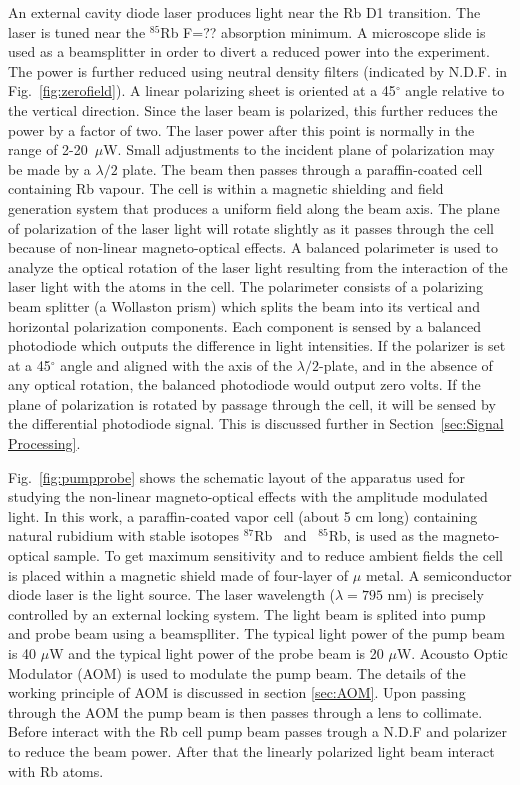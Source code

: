   An external cavity diode laser produces light near the Rb D1 transition.  The laser is tuned near the $^{85}$Rb F=?? absorption minimum.  A microscope slide is used as a beamsplitter in order to divert a reduced power into the experiment.  The power is further reduced using neutral density filters (indicated by N.D.F. in Fig.~\ref{fig:zerofield}).  A linear polarizing sheet is oriented at a 45$^\circ$ angle relative to the vertical direction.  Since the laser
beam is polarized, this further reduces the power by a factor of two. The laser power after this point is normally in the range of 2-20~$\mu$W.  Small adjustments to the incident plane of polarization may be made by a $\lambda/2$ plate.  The beam then passes through a paraffin-coated cell containing Rb vapour.  The cell is within a
magnetic shielding and field generation system that produces a uniform field along the beam axis.  The plane of polarization of the laser
light will rotate slightly as it passes through the cell because of
non-linear magneto-optical effects.  A balanced polarimeter is used to
analyze the optical rotation of the laser light resulting from the
interaction of the laser light with the atoms in the cell.  The
polarimeter consists of a polarizing beam splitter (a Wollaston prism)
which splits the beam into its vertical and horizontal polarization
components.  Each component is sensed by a balanced photodiode which
outputs the difference in light intensities.  If the polarizer is set
at a 45$^\circ$ angle and aligned with the axis of the
$\lambda/2$-plate, and in the absence of any optical rotation, the
balanced photodiode would output zero volts.  If the plane of
polarization is rotated by passage through the cell, it will be sensed
 by the differential photodiode signal.  This is discussed further in Section~\ref{sec:Signal Processing}.
 
 Fig.~\ref{fig:pumpprobe}  shows the schematic layout of the apparatus used for studying the
non-linear magneto-optical effects with the amplitude modulated
light. In this work, a paraffin-coated vapor cell (about 5 cm long)
containing natural rubidium with stable isotopes $^{87}$Rb~ and~
$^{85}$Rb, is used as the magneto-optical sample. To get maximum
sensitivity and to reduce ambient fields the cell is placed within a
magnetic shield made of four-layer of $\mu$ metal. A semiconductor diode laser is the light source. The laser
wavelength ($\lambda=795$ nm) is precisely controlled by an external locking system.  The light beam is splited into pump and
probe beam using a beamsplliter. The typical light power of the pump
beam is 40 $\mu$W and the typical light power of the probe beam is 20
$\mu$W. Acousto Optic Modulator (AOM) is used to modulate the pump beam. The details of the working principle of AOM is discussed in section \ref{sec:AOM}. Upon passing through the AOM the pump beam is then passes through a lens to collimate. Before interact with the Rb cell pump beam passes trough a N.D.F and polarizer to reduce the beam power. After that the linearly polarized light beam interact with Rb
atoms. 


